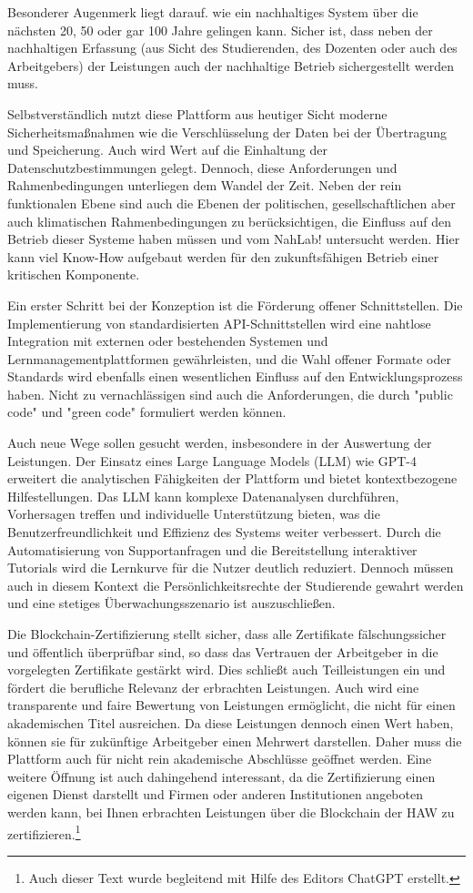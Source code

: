 \documentclass[conference]{IEEEtran}
\begin{document}
Besonderer Augenmerk liegt darauf. wie ein nachhaltiges System über die nächsten 20, 50 oder gar 100 Jahre gelingen kann. Sicher ist, dass neben der nachhaltigen Erfassung (aus Sicht des Studierenden, des Dozenten oder auch des Arbeitgebers) der Leistungen auch der nachhaltige Betrieb sichergestellt werden muss. 

Selbstverständlich nutzt diese Plattform aus heutiger Sicht moderne Sicherheitsmaßnahmen wie die Verschlüsselung der Daten bei der Übertragung und Speicherung. Auch wird Wert auf die Einhaltung der Datenschutzbestimmungen gelegt. Dennoch, diese Anforderungen und Rahmenbedingungen unterliegen dem Wandel der Zeit. Neben der rein funktionalen Ebene sind auch die Ebenen der politischen, gesellschaftlichen aber auch klimatischen Rahmenbedingungen zu berücksichtigen, die Einfluss auf den Betrieb dieser Systeme haben müssen und vom NahLab! untersucht werden. Hier kann viel Know-How aufgebaut werden für den zukunftsfähigen Betrieb einer kritischen Komponente.

Ein erster Schritt bei der Konzeption ist die Förderung offener Schnittstellen. Die Implementierung von standardisierten API-Schnittstellen wird eine nahtlose Integration mit externen oder bestehenden Systemen und Lernmanagementplattformen gewährleisten, und die Wahl offener Formate oder Standards wird ebenfalls einen wesentlichen Einfluss auf den Entwicklungsprozess haben. Nicht zu vernachlässigen sind auch die Anforderungen, die durch "public code" und "green code" formuliert werden können.

Auch neue Wege sollen gesucht werden, insbesondere in der Auswertung der Leistungen. Der Einsatz eines Large Language Models (LLM) wie GPT-4 erweitert die analytischen Fähigkeiten der Plattform und bietet kontextbezogene Hilfestellungen. Das LLM kann komplexe Datenanalysen durchführen, Vorhersagen treffen und individuelle Unterstützung bieten, was die Benutzerfreundlichkeit und Effizienz des Systems weiter verbessert. Durch die Automatisierung von Supportanfragen und die Bereitstellung interaktiver Tutorials wird die Lernkurve für die Nutzer deutlich reduziert. Dennoch müssen auch in diesem Kontext die Persönlichkeitsrechte der Studierende gewahrt werden und eine stetiges Überwachungsszenario ist auszuschließen. 

Die Blockchain-Zertifizierung stellt sicher, dass alle Zertifikate fälschungssicher und öffentlich überprüfbar sind, so dass  das Vertrauen der Arbeitgeber in die vorgelegten Zertifikate gestärkt wird. Dies schließt auch Teilleistungen ein und fördert die berufliche Relevanz der erbrachten Leistungen.
Auch wird eine transparente und faire Bewertung von Leistungen ermöglicht, die nicht für einen akademischen Titel ausreichen. Da diese Leistungen dennoch einen Wert  haben, können sie für zukünftige Arbeitgeber einen Mehrwert darstellen. Daher muss die Plattform auch für nicht rein akademische Abschlüsse geöffnet werden. Eine weitere Öffnung ist auch dahingehend interessant, da die Zertifizierung einen eigenen Dienst darstellt und Firmen oder anderen Institutionen angeboten werden kann, bei Ihnen erbrachten Leistungen über die Blockchain der HAW zu zertifizieren.\footnote{Auch dieser Text wurde begleitend mit Hilfe des Editors ChatGPT erstellt.}



\end{document}
